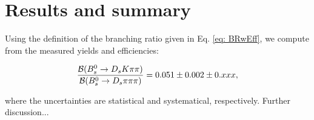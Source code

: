 \section{Results and summary}
\label{sec: results}

Using the definition of the branching ratio given in Eq. \ref{eq: BRwEff}, we compute from the measured yields and efficiencies:

\begin{equation}
\frac{\mathcal{B}({{B}^0_{s}}\rightarrow{\ensuremath{{D}_{s}}}{\ensuremath{K}}{\ensuremath{\pi}}{\ensuremath{\pi}})}{\mathcal{B}({{B}^0_{s}}\rightarrow{\ensuremath{{D}_{s}}}{\ensuremath{\pi}}{\ensuremath{\pi}}{\ensuremath{\pi}})} = 0.051 \pm 0.002 \pm 0.xxx,
\label{eq: resultBR}
\end{equation}

where the uncertainties are statistical and systematical, respectively.
Further discussion...
